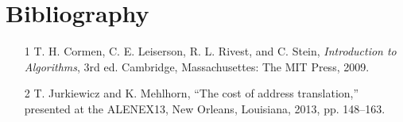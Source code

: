 \section{Bibliography}
  \begin{itemize}
    \item[1] T. H. Cormen, C. E. Leiserson, R. L. Rivest, and C. Stein,
    \textit{Introduction to Algorithms}, 3rd ed. Cambridge, Massachusettes: The
    MIT Press, 2009.
    
    \item[2] T. Jurkiewicz and K. Mehlhorn, “The cost of address
    translation,” presented at the ALENEX13, New Orleans, Louisiana, 2013, pp.
    148–163.
    
  \end{itemize}